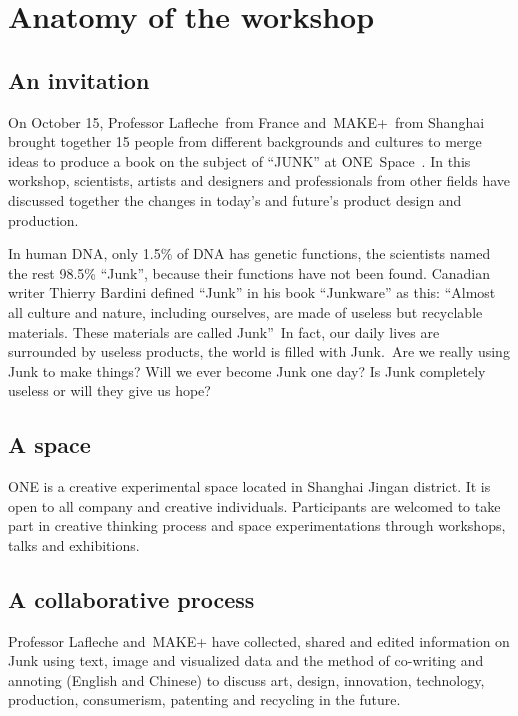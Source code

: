 \section{Anatomy of the workshop}

\subsection{An invitation}

On October 15, Professor Lafleche~from France and~MAKE+~from Shanghai
brought together 15 people from different backgrounds and cultures to
merge ideas to produce a book on the subject of
{\textquotedblleft}JUNK{\textquotedblright} at ONE~Space~. In this
workshop, scientists, artists and designers and professionals from
other fields have discussed together the changes in
today{\textquoteright}s and future{\textquoteright}s product design and
production.

In human DNA, only 1.5\% of DNA has genetic functions, the scientists
named the rest 98.5\% {\textquotedblleft}Junk{\textquotedblright},
because their functions have not been found. Canadian writer Thierry
Bardini defined {\textquotedblleft}Junk{\textquotedblright} in his book
{\textquotedblleft}Junkware{\textquotedblright} as this:
{\textquotedblleft}Almost all culture and nature, including ourselves,
are made of useless but recyclable materials. These materials are
called Junk{\textquotedblright}~In fact, our daily lives are surrounded
by useless products, the world is filled with Junk.~Are we really using
Junk to make things? Will we ever become Junk one day? Is Junk
completely useless or will they give us hope?

\subsection{A space }

ONE is a creative experimental space located in Shanghai Jingan
district. It is open to all company and creative individuals.
Participants are welcomed to take part in creative thinking process and
space experimentations through workshops, talks and exhibitions.

\subsection{A collaborative process}

Professor Lafleche and~MAKE+ have collected, shared and edited
information on Junk using text, image and visualized data and the
method of co-writing and annoting (English and Chinese) to discuss art,
design, innovation, technology, production, consumerism, patenting and
recycling in the future.

